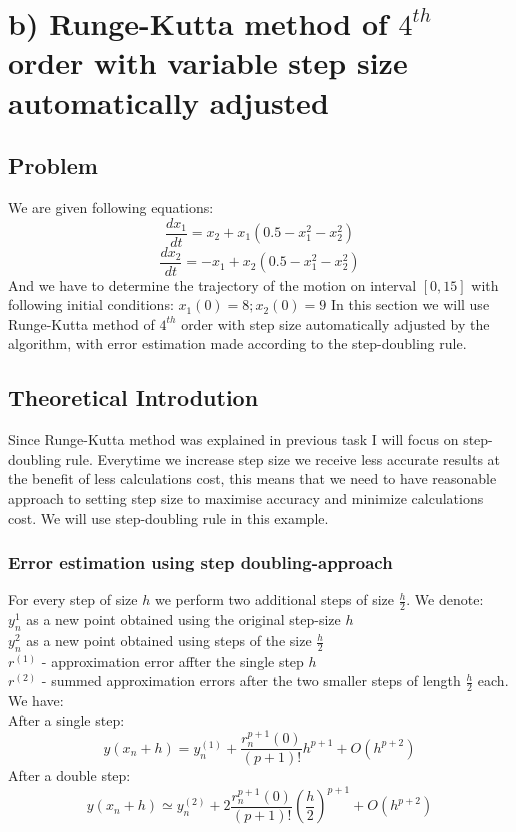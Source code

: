 \documentclass[12pt]{report}
\begin{document}
\section{b) Runge-Kutta method of $4^{th}$ order with variable step size automatically adjusted}
\subsection{Problem}
We are given following equations:
\[ \frac{dx_1}{dt} = x_2 + x_1(0.5 - x_1^2 - x_2^2) \]
\[ \frac{dx_2}{dt} = -x_1 + x_2(0.5 - x_1^2 - x_2^2) \]
And we have to determine the trajectory of the motion on interval $[0, 15]$ with following initial conditions:
$ x_1(0) = 8; x_2(0) = 9 $
In this section we will use Runge-Kutta method of $4^{th}$ order with step size automatically adjusted by the algorithm, with error estimation made according to the step-doubling rule.
\subsection{Theoretical Introdution}
Since Runge-Kutta method was explained in previous task I will focus on step-doubling rule.
Everytime we increase step size we receive less accurate results at the benefit of less calculations cost, this means that we need to have reasonable approach to setting step size to maximise accuracy and minimize calculations cost. We will use step-doubling rule in this example.

\subsubsection{Error estimation using step doubling-approach}
For every step of size $h$ we perform two additional steps of size $\frac{h}{2}$. We denote: \\
$y_n^{1}$ as a new point obtained using the original step-size $h$ \\
$y_n^{2}$ as a new point obtained using steps of the size $\frac{h}{2}$ \\
$r^{(1)}$ - approximation error affter the single step $h$ \\
$r^{(2)}$ - summed approximation errors after the two smaller steps of length $\frac{h}{2}$ each. \\
We have: \\
\newpage
After a single step:
\[ y(x_n + h) = y_n^{(1)} + \frac{r_n^{p+1}(0)}{(p+1)!}h^{p+1} + O(h^{p+2}) \]
After a double step:
\[  y(x_n+h) \simeq y_n^{(2)} + 2\frac{r_n^{p+1}(0)}{(p+1)!}(\frac{h}{2})^{p+1} + O(h^{p+2}) \]
\end{document}
